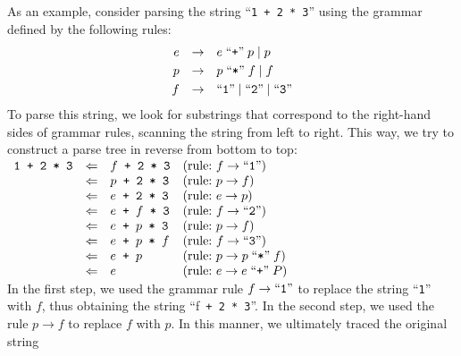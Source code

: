 As an example, consider parsing the string ``\texttt{1 + 2 * 3}'' using the grammar defined by the following rules:
\[ 
\begin{array}[t]{rcl}
  e & \rightarrow & e \;\mbox{``\texttt{+}''}\; p \;|\; p  \\[0.1cm]
  p & \rightarrow & p \;\mbox{``\texttt{*}''}\; f \;|\; f  \\[0.1cm]
  f & \rightarrow & \mbox{``\texttt{1}''} \;|\; \mbox{``\texttt{2}''} \;|\; \mbox{``\texttt{3}''} 
\end{array}
\]
To parse this string, we look for substrings that correspond to the right-hand sides of grammar rules, scanning the string from left to right. This way, we try to construct a parse tree in reverse from bottom to top:
\\[0.2cm]
\hspace*{0.3cm} 
$
\begin{array}[t]{lcll}
\texttt{1 + 2 * 3} & \Leftarrow & f \texttt{ + 2 * 3} 
                                & (\mbox{rule:\ }  f \rightarrow  \mbox{``\texttt{1}''}) \\
                   & \Leftarrow & p \texttt{ + 2 * 3} 
                                & (\mbox{rule:\ } p \rightarrow f) \\
                   & \Leftarrow & e \texttt{ + 2 * 3} 
                                & (\mbox{rule:\ }  e \rightarrow  p) \\
                   & \Leftarrow & e \texttt{ + } f \texttt{ * 3} 
                                & (\mbox{rule:\ } f \rightarrow  \mbox{``\texttt{2}''}) \\
                   & \Leftarrow & e \texttt{ + } p \texttt{ * 3} 
                                & (\mbox{rule:\ } p \rightarrow f) \\
                   & \Leftarrow & e \texttt{ + } p \texttt{ * } f 
                                & (\mbox{rule:\ } f \rightarrow \mbox{``\texttt{3}''}) \\
                   & \Leftarrow & e \texttt{ + } p & (\mbox{rule:\ } p \rightarrow p \;\mbox{``\texttt{*}''}\; f) \\
                   & \Leftarrow & e                & (\mbox{rule:\ } e \rightarrow e \;\mbox{``\texttt{+}''}\; P) 
\end{array}
$
\\[0.2cm]
In the first step, we used the grammar rule \(f \rightarrow \mbox{``\texttt{1}''}\) to replace the string ``\texttt{1}''
with \(f\), thus obtaining the string ``f\texttt{ + 2 * 3}''. In the second step, we used the rule \(p
\rightarrow f\) to replace \(f\) with \(p\). In this manner, we ultimately traced the original string
